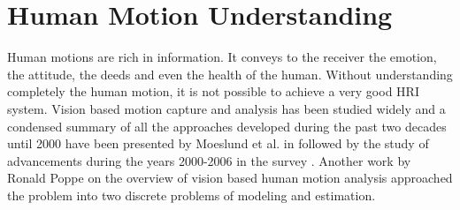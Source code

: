 \section{Human Motion Understanding} %
 Human motions are rich in information. It conveys to the receiver the emotion, the attitude, the deeds and even the health of the human. Without understanding completely the human motion, it is not possible to achieve a very good HRI system.  Vision based motion capture and analysis has been studied widely and a condensed summary of all the approaches developed during the past two decades until 2000 have been presented by Moeslund et al. in \cite{Moeslund2001231} followed by the study of advancements during the years 2000-2006 in the survey \cite{Moeslund200690}. Another work by Ronald Poppe \cite{Poppe20074} on the overview of vision based human motion analysis approached the problem into two discrete problems of modeling and estimation.
